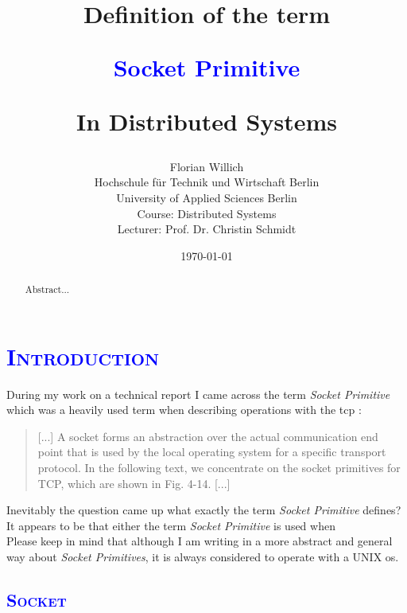 \documentclass[xcolor=dvipsnames]{article}
\title{\scshape{
\begin{small}
Definition of the term\\
\end{small} 
\textbf{\textcolor{blue}{Socket Primitive}}\\
\begin{small}
In Distributed Systems
\end{small}
}}
\author{Florian Willich \\ Hochschule f\"ur Technik und Wirtschaft Berlin \\ University of Applied Sciences Berlin \\ Course: Distributed Systems \\ Lecturer: Prof. Dr. Christin Schmidt}
\date{\today}
\begin{document}

\begin{titlepage}

\maketitle

\begin{abstract}
Abstract...
\end{abstract}

\end{titlepage}

\newpage

\tableofcontents

\newpage


\section{\scshape{\textcolor{blue}{Introduction}}} \label{introduction}

During my work on a technical report I came across the term \textit{Socket Primitive} which was a heavily used term when describing operations with the \gls{tcp} \cite[p. 141, ch. 4.3.1]{tanenbaum}:

\begin{quote}
[...] A socket forms an abstraction over the actual communication end
point that is used by the local operating system for a specific
transport protocol. In the following text, we concentrate on the socket
primitives for TCP, which are shown in Fig. 4-14. [...] 
\end{quote}

\noindent Inevitably the question came up what exactly the term \textit{Socket Primitive} defines?\\

\noindent It appears to be that either the term \textit{Socket Primitive} is used when\\

\noindent Please keep in mind that although I am writing in a more abstract and general way about \textit{Socket Primitives}, it is always considered to operate with a UNIX \gls{os}.

\subsection{\scshape{\textcolor{blue}{Socket}}}\label{introduction_socket}
\end{document}
